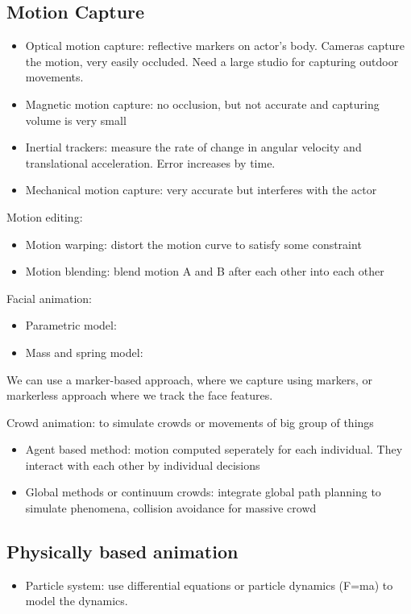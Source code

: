 \documentclass[a4paper]{article}
\begin{document}
\subsection{Motion Capture}
\begin{itemize}
    \item Optical motion capture: reflective markers on actor's body. Cameras capture the motion, very easily occluded. Need a large studio for capturing outdoor movements.
    \item Magnetic motion capture: no occlusion, but not accurate and capturing volume is very small
    \item Inertial trackers: measure the rate of change in angular velocity and translational acceleration. Error increases by time.
    \item Mechanical motion capture: very accurate but interferes with the actor
\end{itemize}

Motion editing: 
\begin{itemize}
    \item Motion warping: distort the motion curve to satisfy some constraint
    \item Motion blending: blend motion A and B after each other into each other
\end{itemize}

Facial animation:
\begin{itemize}
    \item Parametric model: %
    \item Mass and spring model: %
\end{itemize}

We can use a marker-based approach, where we capture using markers, or markerless approach where we track the face features.

Crowd animation: to simulate crowds or movements of big group of things
\begin{itemize}
    \item Agent based method: motion computed seperately for each individual. They interact with each other by individual decisions
    \item Global methods or continuum crowds: integrate global path planning to simulate phenomena, collision avoidance for massive crowd
\end{itemize}

\subsection{Physically based animation}
\begin{itemize}
    \item Particle system: use differential equations or particle dynamics (F=ma) to model the dynamics.
\end{itemize}
\end{document}
